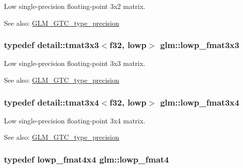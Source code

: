 Low single-precision floating-point 3x2 matrix. \begin{Desc}
\item[See also:]\hyperlink{group__gtc__type__precision}{GLM\_\-GTC\_\-type\_\-precision} \end{Desc}
\hypertarget{group__gtc__type__precision_g25b389b52269f3256f015b4fff5789c2}{
\subsubsection[lowp\_\-fmat3x3]{\setlength{\rightskip}{0pt plus 5cm}typedef detail::tmat3x3$<$f32, lowp$>$ {\bf glm::lowp\_\-fmat3x3}}}
\label{group__gtc__type__precision_g25b389b52269f3256f015b4fff5789c2}


Low single-precision floating-point 3x3 matrix. \begin{Desc}
\item[See also:]\hyperlink{group__gtc__type__precision}{GLM\_\-GTC\_\-type\_\-precision} \end{Desc}
\hypertarget{group__gtc__type__precision_g366a3249a72ddc76fb3ee4f2379cf3fb}{
\subsubsection[lowp\_\-fmat3x4]{\setlength{\rightskip}{0pt plus 5cm}typedef detail::tmat3x4$<$f32, lowp$>$ {\bf glm::lowp\_\-fmat3x4}}}
\label{group__gtc__type__precision_g366a3249a72ddc76fb3ee4f2379cf3fb}


Low single-precision floating-point 3x4 matrix. \begin{Desc}
\item[See also:]\hyperlink{group__gtc__type__precision}{GLM\_\-GTC\_\-type\_\-precision} \end{Desc}
\hypertarget{group__gtc__type__precision_g00dfb85ec53bb5f173747f73d13c1b8b}{
\subsubsection[lowp\_\-fmat4]{\setlength{\rightskip}{0pt plus 5cm}typedef lowp\_\-fmat4x4 {\bf glm::lowp\_\-fmat4}}}
\label{group__gtc__type__precision_g00dfb85ec53bb5f173747f73d13c1b8b}


